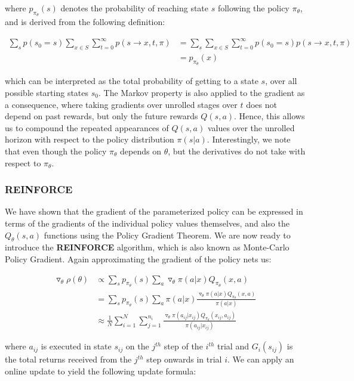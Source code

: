 \documentclass[11pt]{article}
\begin{document}
where $p_{\pi_{\theta}}(s)$ denotes the probability of reaching state $s$ following the policy $\pi_{\theta}$, and is derived from the following definition:

$$
\begin{aligned}
\sum_s p(s_0 = s) \sum_{x \in S} \sum^{\infty}_{t=0} p(s \rightarrow x, t, \pi) 
&= \sum_s \sum_{x \in S} \sum^{\infty}_{t=0} p(s_0 = s) p(s \rightarrow x, t, \pi)\\
&= p_{\pi_{\theta}}(x)
\end{aligned}
$$

which can be interpreted as the total probability of getting to a state $s$, over all possible starting states $s_0$. The Markov property is also applied to the gradient as a consequence, where taking gradients over unrolled stages over $t$ does not depend on past rewards, but only the future rewards $Q(s, a)$. Hence, this allows us to compound the repeated appearances of $Q(s, a)$ values over the unrolled horizon with respect to the policy distribution $\pi(s|a)$. Interestingly, we note that even though the policy $\pi_{\theta}$ depends on $\theta$, but the derivatives do not take with respect to $\pi_{\theta}$.

\subsubsection{REINFORCE}

We have shown that the gradient of the parameterized policy can be expressed in terms of the gradients of the individual policy values themselves, and also the $Q_{\theta}(s, a)$ functions using the Policy Gradient Theorem. We are now ready to introduce the \textbf{REINFORCE} algorithm, which is also known as Monte-Carlo Policy Gradient. Again approximating the gradient of the policy nets us:

$$
\begin{aligned}
\triangledown_{\theta} \rho(\theta) &\propto \sum_s p_{\pi_{\theta}}(s)\sum_a \triangledown_{\theta}\pi(a | x) Q_{\pi_{\theta}}(x, a)\\
&= \sum_s p_{\pi_{\theta}}(s)\sum_a \pi(a | x) \frac{\triangledown_{\theta} \pi(a | x) Q_{\pi_{\theta}}(x, a)}{\pi(a | x)}\\
&\approx \frac{1}{N} \sum^N_{i=1} \sum^{n_i}_{j=1} \frac{\triangledown_{\theta} \pi(a_{ij} | x_{ij}) Q_{\pi_{\theta}}(x_{ij}, a_{ij})}{\pi(a_{ij} | x_{ij})}
\end{aligned}
$$

where $a_{ij}$ is executed in state $s_{ij}$ on the $j^{th}$ step of the $i^{th}$ trial and $G_i(s_{ij})$ is  the total returns received from the $j^{th}$ step onwards in trial $i$. We can apply an online update to yield the following update formula:
\end{document}
